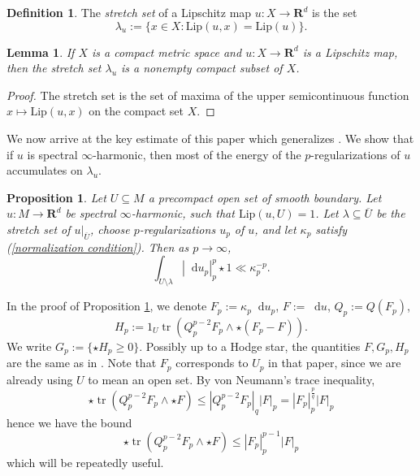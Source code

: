 \documentclass[reqno,11pt]{amsart}
\newcommand{\RR}{\mathbf{R}}
\newcommand*\dif{\mathop{}\!\mathrm{d}}
\DeclareMathOperator{\tr}{tr}
\newcommand{\Lip}{\mathrm{Lip}}
\newcommand{\dfn}[1]{\emph{#1}\index{#1}}
\newtheorem{lemma}[theorem]{Lemma}
\newtheorem{proposition}[theorem]{Proposition}
\theoremstyle{definition}
\newtheorem{definition}[theorem]{Definition}
\numberwithin{equation}{section}
\begin{document}
\begin{definition}
The \dfn{stretch set} of a Lipschitz map $u: X \to \RR^d$ is the set 
$$\lambda_u := \{x \in X: \Lip(u, x) = \Lip(u)\}.$$
\end{definition}

\begin{lemma}\label{stretch set is compact}
If $X$ is a compact metric space and $u: X \to \RR^d$ is a Lipschitz map, then the stretch set $\lambda_u$ is a nonempty compact subset of $X$.
\end{lemma}
\begin{proof}
The stretch set is the set of maxima of the upper semicontinuous function $x \mapsto \Lip(u, x)$ on the compact set $X$.
\end{proof}

We now arrive at the key estimate of this paper which generalizes \cite[Proposition 6.5]{daskalopoulos2022transverse}.
We show that if $u$ is spectral $\infty$-harmonic, then most of the energy of the $p$-regularizations of $u$ accumulates on $\lambda_u$.

\begin{proposition}\label{main estimate}
Let $U \subseteq M$ a precompact open set of smooth boundary.
Let $u: M \to \RR^d$ be spectral $\infty$-harmonic, such that $\Lip(u, U) = 1$.
Let $\lambda \subseteq \overline U$ be the stretch set of $u|_{\overline U}$, choose $p$-regularizations $u_p$ of $u$, and let $\kappa_p$ satisfy (\ref{normalization condition}).
Then as $p \to \infty$,
\begin{equation}\label{decay}
\int_{U \setminus \lambda} |\dif u_p|_{p}^p \star 1 \ll \kappa_p^{-p}.
\end{equation}
\end{proposition}

In the proof of Proposition \ref{main estimate}, we denote $F_p := \kappa_p \dif u_p$, $F := \dif u$, $Q_p := Q(F_p)$,
$$H_p := 1_U \tr(Q_p^{p - 2} F_p \wedge \star(F_p - F)).$$
We write $G_p := \{\star H_p \geq 0\}$.
Possibly up to a Hodge star, the quantities $F, G_p, H_p$ are the same as in \cite[\S7]{daskalopoulos2022analytic}.
Note that $F_p$ corresponds to $U_p$ in that paper, since we are already using $U$ to mean an open set.
By von Neumann's trace inequality,
$$\star \tr(Q_p^{p - 2} F_p \wedge \star F) \leq |Q_p^{p - 2} F_p|_q |F|_p = |F_p|_p^{\frac{p}{q}} |F|_p$$
hence we have the bound
\begin{equation}\label{bound on half of Hp}
  \star \tr(Q_p^{p - 2} F_p \wedge \star F) \leq |F_p|_p^{p - 1} |F|_p
\end{equation}
which will be repeatedly useful.
\end{document}
